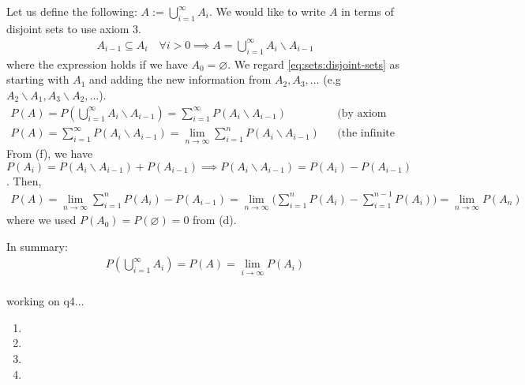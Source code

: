 \begin{enumerate}[label=\alph*.]
Let us define the following: $A := \bigcup_{i=1}^{\infty} A_{i}$. We would like to write $A$ in terms of disjoint sets to use axiom 3.
\begin{align}\label{eq:sets:disjoint-sets}
A_{i-1} \subseteq A_i \quad \forall i > 0 \implies A = \bigcup_{i=1}^{\infty} A_{i}\backslash A_{i-1}
\end{align}
where the expression holds if we have $A_{0} = \varnothing$. We regard \ref{eq:sets:disjoint-sets} as starting with $A_1$ and adding the new information from $A_2, A_3,\dots$ (e.g $A_2 \backslash A_1, A_3 \backslash A_2, \dots$). 
\begin{align}\label{eq:sets:axiom3-on-set}
P(A) = P\left(\bigcup_{i=1}^{\infty} A_{i}\backslash A_{i-1}\right) = \sum_{i=1}^\infty P(A_{i}\backslash A_{i-1})&&\text{(by axiom 3)}\\
P(A) = \sum_{i=1}^\infty P(A_{i}\backslash A_{i-1}) = \lim_{n\xrightarrow{}\infty} \sum_{i=1}^n P(A_{i}\backslash A_{i-1}) &&\text{(the infinite summation is a limit)}
\end{align}
From (f), we have $P(A_i) = P(A_{i}\backslash A_{i-1}) + P(A_{i-1}) \implies  P(A_{i}\backslash A_{i-1}) = P(A_i) - P(A_{i-1})$. Then,
\begin{align}
P(A) = \lim_{n\xrightarrow{}\infty} \sum_{i=1}^n P(A_i) - P(A_{i-1}) = \lim_{n\xrightarrow{}\infty} \bigg(\sum_{i=1}^n P(A_i) - \sum_{i=1}^{n-1} P(A_{i})\bigg) = \lim_{n\xrightarrow{}\infty} P(A_n)
\end{align}
where we used $P(A_0) = P(\varnothing) = 0$ from (d). 

In summary:
\begin{align}
P\left(\bigcup_{i=1}^{\infty} A_{i}\right) = P(A) = \lim_{i\xrightarrow{}\infty} P(A_i)
\end{align}

\end{enumerate}

\paragraph{}

working on q4...

\begin{enumerate}[label=\alph*.]
\item
\item
\item
\item
\end{enumerate}

